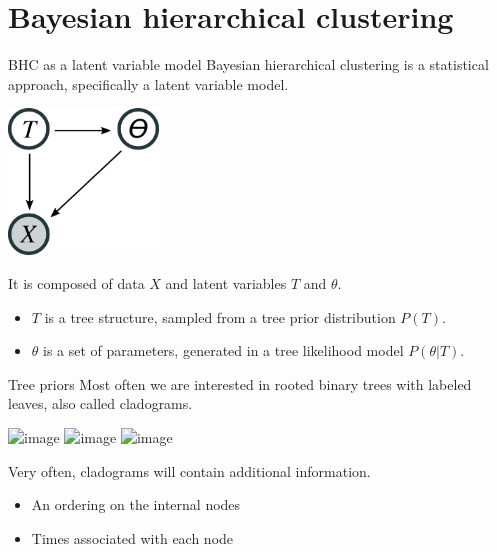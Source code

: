 \documentclass[10pt, compress]{beamer}
\begin{document}
\section{Bayesian hierarchical clustering}

\begin{frame}{BHC as a latent variable model}
  Bayesian hierarchical clustering is a
  statistical approach, specifically
  a \alert{latent variable model}.
  \pause
  \begin{center}
    \includegraphics[width=0.3\textwidth]{img/bhc-lvm}
  \end{center}
  It is composed of data $X$ and
  latent variables $T$ and $\theta$.
  \pause
  \begin{itemize}
    \item $T$ is a tree structure, sampled from a \alert{tree prior} distribution $P(T)$.
    \item $\theta$ is a set of parameters, generated in a \alert{tree likelihood} model $P(\theta | T)$.
  \end{itemize}
\end{frame}

\begin{frame}{Tree priors}
  Most often we are interested in rooted binary trees with labeled leaves,
  also called \alert{cladograms}.

  \begin{center}
    \includegraphics<1>[width=0.4\textwidth]{img/tree-4}
    \includegraphics<2>[width=0.4\textwidth]{img/tree-4-ordering}
    \includegraphics<3>[width=0.4\textwidth]{img/tree-4-ordering-times}
  \end{center}

  Very often, cladograms will contain additional information.

  \begin{itemize}
    \item<2-> An ordering on the internal nodes
    \item<3-> Times associated with each node
  \end{itemize}

\end{frame}
\end{document}
